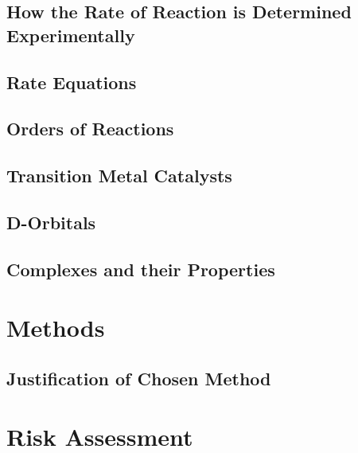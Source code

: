\subsection{How the Rate of Reaction is Determined Experimentally}



\subsection{Rate Equations}



\subsection{Orders of Reactions}



\subsection{Transition Metal Catalysts}



\subsection{D-Orbitals}



\subsection{Complexes and their Properties}



\section{Methods}


\subsection{Justification of Chosen Method}


\section{Risk Assessment}